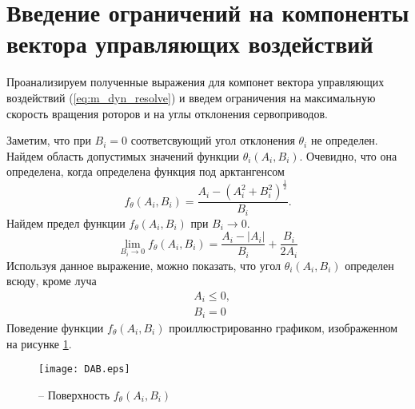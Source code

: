 \section{Введение ограничений на компоненты вектора управляющих воздействий}
\label{section:limits}

Проанализируем полученные выражения для компонет вектора управляющих воздействий (\ref{eq:m_dyn_resolve}) и введем ограничения на максимальную скорость вращения роторов и на углы отклонения сервоприводов.

Заметим, что при $B_i = 0$ соответсвующий угол отклонения $\theta_i$ не определен. Найдем область допустимых значений функции $\theta_i(A_i, B_i)$. Очевидно, что она определена, когда определена функция под арктангенсом
\begin{equation}
f_{\theta}(A_i, B_i) = \frac{A_i-(A^2_i +  B^2_i)^{\frac{1}{2}}}{B_i}.
\end{equation}
Найдем предел функции $f_{\theta}(A_i, B_i)$ при $B_i \to 0$.
\begin{equation}
\lim_{B_i \to 0} f_{\theta}(A_i, B_i) =
\frac{{A_i} - |A_i|}{B_i} + 
\frac{B_i}{2A_i}
\end{equation}
Используя данное выражение, можно показать, что угол $\theta_i(A_i, B_i)$ определен всюду, кроме луча
\begin{equation} \label{m_theta_exists}
\begin{aligned}
&A_i \leq 0, \\
&B_i = 0
\end{aligned}
\end{equation}
Поведение функции $f_{\theta}(A_i, B_i)$ проиллюстрированно графиком, изображенном на рисунке \ref{fig:f_th}.
\begin{figure}[h!]
	\centering
	\texttt{[image: DAB.eps]}
	\caption{ -- Поверхность $f_{\theta}(A_i, B_i)$}
	\label{fig:f_th}
\end{figure}

